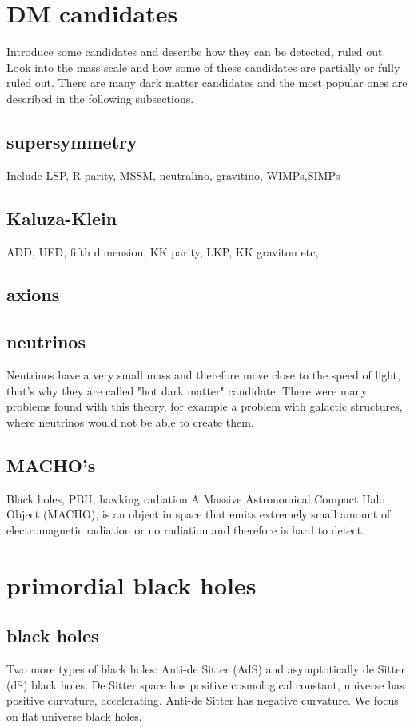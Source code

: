 \documentclass{article}
\begin{document}
\section {DM candidates}
Introduce some candidates and describe how they can be detected, ruled out. 
Look into the mass scale and how some of these candidates are partially or fully ruled out. 
There are many dark matter candidates and the most popular ones are described in the following subsections. 
\subsection{supersymmetry}

Include LSP, R-parity, MSSM, neutralino, gravitino, WIMPs,SIMPs 

\subsection{Kaluza-Klein}
ADD, UED, fifth dimension, KK parity, LKP, KK graviton etc, 

\subsection {axions}

\subsection {neutrinos}
Neutrinos have a very small mass and therefore move close to the speed of light, that's why they are called "hot dark matter" candidate. There were many problems found with this theory, for example a problem with galactic structures, where neutrinos would not be able to create them. 
\subsection{MACHO's}
Black holes, PBH, hawking radiation 
A Massive Astronomical Compact Halo Object (MACHO), is an object in space that emits extremely small amount of electromagnetic radiation or no radiation and therefore is hard to detect. 
\section{primordial black holes}
\subsection {black holes}
Two more types of black holes: Anti-de Sitter (AdS) and asymptotically de Sitter (dS) black holes.
De Sitter space has positive cosmological constant, universe has positive curvature, accelerating. 
Anti-de Sitter has negative curvature. We focus on flat universe black holes. 
\end{document}
